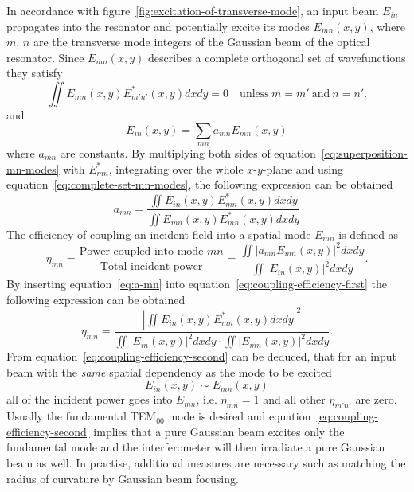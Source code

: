 In accordance with figure~\ref{fig:excitation-of-transverse-mode}, an input beam $E_{in}$ propagates into the resonator and potentially excite its modes $E_{mn}(x,y)$, where $m$, $n$ are the transverse mode integers of the Gaussian beam of the optical resonator.
Since $E_{mn}(x,y)$ describes a complete orthogonal set of wavefunctions they satisfy
\begin{equation}
\label{eq:complete-set-mn-modes}
\iint E_{mn}(x,y) E^*_{m'n'}(x,y) dx dy = 0 \quad \mathrm{unless} \ m=m' \ \mathrm{and} \ n=n'.
\end{equation}
and
\begin{equation}
\label{eq:superposition-mn-modes}
E_{in}(x,y) = \sum_{mn}a_{mn}E_{mn}(x,y)
\end{equation}
where $a_{mn}$ are constants.
By multiplying both sides of equation~\eqref{eq:superposition-mn-modes} with $E_{mn}^*$, integrating over the whole $x$-$y$-plane and using equation~\eqref{eq:complete-set-mn-modes}, the following expression can be obtained
\begin{equation}
\label{eq:a-mn}
a_{mn}=\frac{\iint E_{in}(x,y)E^*_{mn}(x,y) dx dy}{\iint E_{mn}(x,y)E^*_{mn}(x,y) dx dy}
\end{equation}
The efficiency of coupling an incident field into a spatial mode $E_{mn}$ is defined as
\begin{equation}
\label{eq:coupling-efficiency-first}
\eta_{mn}=\frac{\textrm{Power coupled into mode } mn}{\textrm{Total incident power}}=
\frac{\iint \left|a_{mn} E_{mn}(x,y)\right|^2 dx dy}{\iint \left|E_{in}(x,y)\right|^2 dx dy}.
\end{equation}
By inserting equation~\eqref{eq:a-mn} into equation~\eqref{eq:coupling-efficiency-first} the following expression can be obtained
\begin{equation}
\label{eq:coupling-efficiency-second}
\eta_{mn}= \frac{\left|\iint E_{in}(x,y)E^*_{mn}(x,y) dx dy\right|^2}{\iint \left|E_{in}(x,y)\right|^2 dx dy \cdot \iint \left|E_{mn}(x,y)\right|^2 dx dy}.
\end{equation}
From equation~\eqref{eq:coupling-efficiency-second} can be deduced, that for an input beam with the \textit{same} spatial dependency as the mode to be excited
\begin{equation}
E_{in}(x,y) \sim E_{mn}(x,y)
\end{equation}
all of the incident power goes into $E_{mn}$, i.e. $\eta_{mn}=1$ and all other $\eta_{m'n'}$ are zero.
Usually the fundamental TEM$_{00}$ mode is desired and equation~\eqref{eq:coupling-efficiency-second} implies that a pure Gaussian beam excites only the fundamental mode and the interferometer will then irradiate a pure Gaussian beam as well. In practise, additional measures are necessary such as matching the radius of curvature by Gaussian beam focusing.

